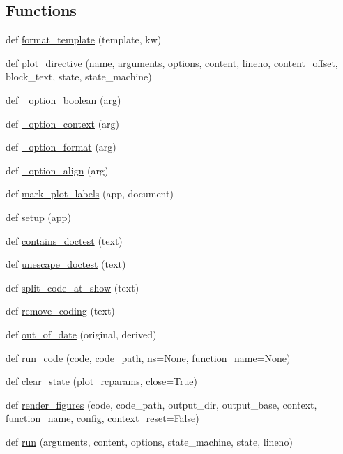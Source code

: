 \subsection*{Functions}
\begin{DoxyCompactItemize}
\item 
def \mbox{\hyperlink{namespaceplot__directive_a572890d21d60caee16537894928e5c31}{format\+\_\+template}} (template, kw)
\item 
def \mbox{\hyperlink{namespaceplot__directive_a81c752988ceef39206d1d2e4308baeea}{plot\+\_\+directive}} (name, arguments, options, content, lineno, content\+\_\+offset, block\+\_\+text, state, state\+\_\+machine)
\item 
def \mbox{\hyperlink{namespaceplot__directive_a8e308295ea7a8485d1cd0aef44a23f16}{\+\_\+option\+\_\+boolean}} (arg)
\item 
def \mbox{\hyperlink{namespaceplot__directive_ae03df9e8ab5d41333bb74a181b7afc7a}{\+\_\+option\+\_\+context}} (arg)
\item 
def \mbox{\hyperlink{namespaceplot__directive_a247804bf5251adf6fc74548816285f1a}{\+\_\+option\+\_\+format}} (arg)
\item 
def \mbox{\hyperlink{namespaceplot__directive_ab503132c3d4a8d97af4e5f19e75ea2d9}{\+\_\+option\+\_\+align}} (arg)
\item 
def \mbox{\hyperlink{namespaceplot__directive_a7f30576eb7e350db2c39b385bf46b6bd}{mark\+\_\+plot\+\_\+labels}} (app, document)
\item 
def \mbox{\hyperlink{namespaceplot__directive_a039f93d2038ba504a023cbbf76ad8478}{setup}} (app)
\item 
def \mbox{\hyperlink{namespaceplot__directive_ac5b52bd431613c97ce90c1f63d8ddec6}{contains\+\_\+doctest}} (text)
\item 
def \mbox{\hyperlink{namespaceplot__directive_aa899adfc2219ac7af0aa9ae176a2c11b}{unescape\+\_\+doctest}} (text)
\item 
def \mbox{\hyperlink{namespaceplot__directive_afda02d52fee93a95c4b928b0d4b250aa}{split\+\_\+code\+\_\+at\+\_\+show}} (text)
\item 
def \mbox{\hyperlink{namespaceplot__directive_a3b49219dfd6c07286c8ef04b6b479c15}{remove\+\_\+coding}} (text)
\item 
def \mbox{\hyperlink{namespaceplot__directive_a91977c55a2c1fa1266cce25e1e724321}{out\+\_\+of\+\_\+date}} (original, derived)
\item 
def \mbox{\hyperlink{namespaceplot__directive_a469169f4fbfd6b8948d1a02bcd9eb85c}{run\+\_\+code}} (code, code\+\_\+path, ns=None, function\+\_\+name=None)
\item 
def \mbox{\hyperlink{namespaceplot__directive_a7577e8f3efd148dc69bb0e39d030c103}{clear\+\_\+state}} (plot\+\_\+rcparams, close=True)
\item 
def \mbox{\hyperlink{namespaceplot__directive_a659cae721da23d794cb3967690a166db}{render\+\_\+figures}} (code, code\+\_\+path, output\+\_\+dir, output\+\_\+base, context, function\+\_\+name, config, context\+\_\+reset=False)
\item 
def \mbox{\hyperlink{namespaceplot__directive_a978468d13700c2d59e021ffcd98820b5}{run}} (arguments, content, options, state\+\_\+machine, state, lineno)
\end{DoxyCompactItemize}
